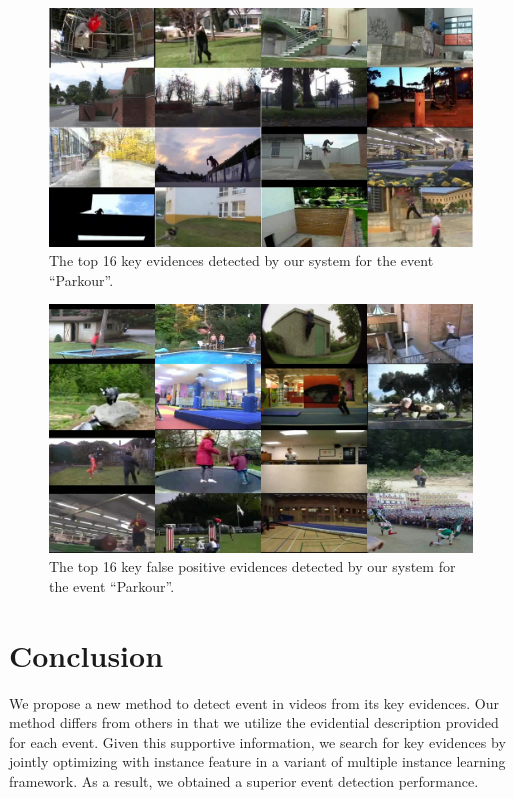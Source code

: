 \begin{figure}
	\centering
	\includegraphics[width=1\textwidth]{parkour.jpg}
	\caption{The top 16 key evidences detected by our system for the event ``Parkour''.}
	\label{figure_5}
\end{figure}

\begin{figure}
	\centering
	\includegraphics[width=1\textwidth]{parkour_neg.jpg}
	\caption{The top 16 key false positive evidences detected by our system for the event ``Parkour''.}
	\label{figure_6}
\end{figure}

\section{Conclusion}
\label{c5_conclusion}
We propose a new method to detect event in videos from its key evidences. Our method differs from others in that we utilize the evidential description provided for each event. Given this supportive information, we search for key evidences by jointly optimizing with instance feature in a variant of multiple instance learning framework. As a result, we obtained a superior event detection performance.


